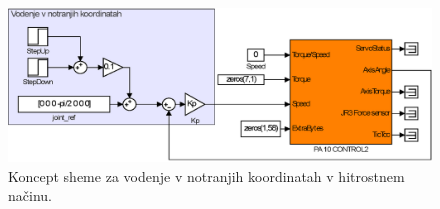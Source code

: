 \begin{figure}
	\centering
	\includegraphics[trim={0 0cm 0 0cm},scale=0.5]{./Slike/notranje_koordinate_vel.eps}
	\caption{Koncept \simulink sheme za vodenje v notranjih koordinatah v hitrostnem na\v{c}inu.}
	\label{fig:notranje_koordinate_vel}
\end{figure}
